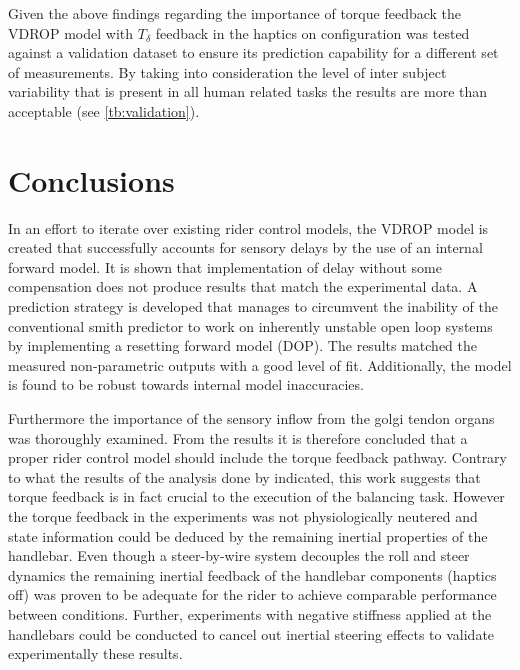 Given the above findings regarding the importance of torque feedback the VDROP model with \ensuremath{{T_\delta}} feedback in the haptics on configuration was tested against a validation dataset to ensure its prediction capability for a different set of measurements. By taking into consideration the level of inter subject variability that is present in all human related tasks the results are more than acceptable (see \cref{tb:validation}).


\section{Conclusions}
In an effort to iterate over existing rider control models, the VDROP model is created that successfully accounts for sensory delays by the use of an internal forward model. It is shown that implementation of delay without some compensation does not produce results that match the experimental data.  A prediction strategy is developed that manages to  circumvent the inability of the conventional smith predictor to work on inherently unstable open loop systems by implementing a resetting forward model (DOP). The results matched the  measured non-parametric outputs with a good level of fit. Additionally, the model is found to be robust towards internal model inaccuracies. 

Furthermore the importance of the sensory inflow from the golgi tendon organs was thoroughly examined. From the results it is therefore concluded that a proper rider control model should include the torque feedback pathway. Contrary to what  the results of the analysis done by \citet{dialynaseffect} indicated, this work suggests that torque feedback is in fact crucial to the execution of the balancing task. However the torque feedback in the experiments was not physiologically neutered and  state information could be deduced by the remaining inertial properties of the handlebar. Even though a steer-by-wire system decouples the roll and steer dynamics the remaining inertial feedback of the handlebar components (haptics off) was proven to be adequate for the rider to achieve comparable performance between conditions. Further, experiments with negative stiffness applied at the handlebars could be conducted to cancel out inertial steering effects to validate experimentally these results.



